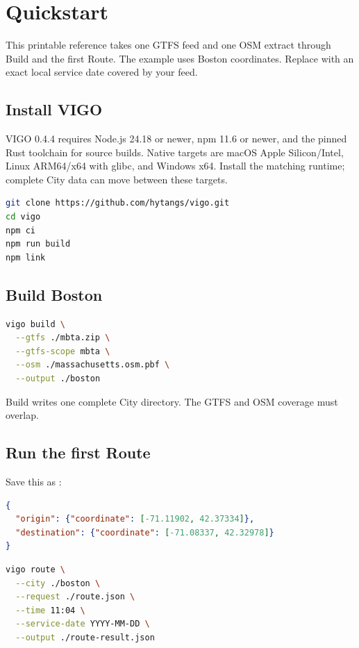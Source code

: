 \documentclass[10pt,letterpaper]{article}
\begin{document}
\guideheader

\section{Quickstart}

This printable reference takes one GTFS feed and one OSM extract through Build and the first Route. The example uses Boston coordinates. Replace  with an exact local service date covered by your feed.

\subsection{Install VIGO}

VIGO 0.4.4 requires Node.js 24.18 or newer, npm 11.6 or newer, and the pinned Rust toolchain for source builds. Native targets are macOS Apple Silicon/Intel, Linux ARM64/x64 with glibc, and Windows x64. Install the matching runtime; complete City data can move between these targets.

\begin{lstlisting}[language=bash]
git clone https://github.com/hytangs/vigo.git
cd vigo
npm ci
npm run build
npm link
\end{lstlisting}

\subsection{Build Boston}

\begin{lstlisting}[language=bash]
vigo build \
  --gtfs ./mbta.zip \
  --gtfs-scope mbta \
  --osm ./massachusetts.osm.pbf \
  --output ./boston
\end{lstlisting}

Build writes one complete City directory. The GTFS and OSM coverage must overlap.

\subsection{Run the first Route}

Save this as \code{route.json}:

\begin{lstlisting}[language=json]
{
  "origin": {"coordinate": [-71.11902, 42.37334]},
  "destination": {"coordinate": [-71.08337, 42.32978]}
}
\end{lstlisting}

\begin{lstlisting}[language=bash]
vigo route \
  --city ./boston \
  --request ./route.json \
  --time 11:04 \
  --service-date YYYY-MM-DD \
  --output ./route-result.json
\end{lstlisting}
\end{document}
